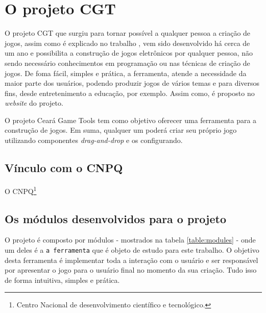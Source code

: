 \documentclass[12pt,twoside,openright,a4paper,english,brazil,sumario=tradicional]{abntex2}
\begin{document}
\section{O projeto CGT}
O projeto CGT que surgiu para tornar possível a qualquer pessoa a criação de jogos, assim como é explicado no trabalho \cite{monografia:aquino}, vem sido desenvolvido há cerca de um ano e possibilita a construção de jogos eletrônicos por qualquer pessoa, não sendo necessário conhecimentos em programação ou nas técnicas de criação de jogos. De foma fácil, simples e prática, a ferramenta, atende a necessidade da maior parte dos usuários, podendo produzir jogos de vários temas e para diversos fins, desde entretenimento a educação, por exemplo. Assim como, é proposto no \emph{website} do projeto.

\begin{citacao}
O projeto Ceará Game Tools tem como objetivo oferecer uma ferramenta para a construção de jogos. Em suma, qualquer um poderá criar seu próprio jogo utilizando componentes \emph{drag-and-drop} e os configurando. \cite{website:projeto-cgt}
\end{citacao}

\subsection{Vínculo com o CNPQ} %
O CNPQ\footnote{Centro Nacional de desenvolvimento científico e tecnológico.}

\subsection{Os módulos desenvolvidos para o projeto}
O projeto é composto por módulos - mostrados na tabela \ref{table:modules} - onde um deles é a \texttt{a ferramenta} que é objeto de estudo para este trabalho. O objetivo desta ferramenta é implementar toda a interação com o usuário e ser responsável por apresentar o jogo para o usuário final no momento da sua criação. Tudo isso de forma intuitiva, simples e prática.

\begin{table}

\end{table}
\end{document}
